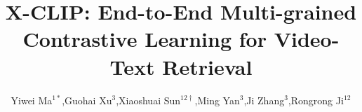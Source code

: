\documentclass[sigconf]{acmart}
\begin{document}
\title{X-CLIP: End-to-End Multi-grained Contrastive Learning for Video-Text Retrieval}





  \author{
     Yiwei Ma$^{1*}$,\quad Guohai Xu$^{3}$,\quad Xiaoshuai Sun$^{12\dagger}$,\quad Ming Yan$^{3}$,\quad Ji Zhang$^{3}$,\quad Rongrong Ji$^{12}$ 
    }

     
\def\authors{Yiwei Ma, Guohai Xu, Xiaoshuai Sun, Ming Yan, Ji Zhang, Rongrong Ji}

\renewcommand{\shortauthors}{Yiwei Ma et al.}
\end{document}
